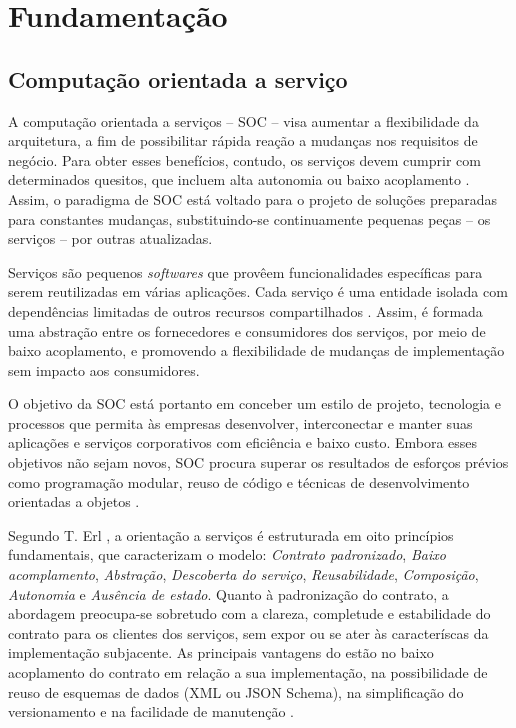 \section{Fundamentação}
\label{Fundamentacao}

\subsection{Computação orientada a serviço}

A computação orientada a serviços -- SOC -- visa aumentar a flexibilidade da
arquitetura, a fim de possibilitar rápida reação a mudanças nos requisitos de
negócio.
Para obter esses benefícios, contudo, os serviços devem cumprir com determinados quesitos, que
incluem alta autonomia ou baixo acoplamento \cite{erl2008soa}. Assim, o paradigma de SOC
está voltado para o projeto de soluções preparadas para constantes mudanças,
substituindo-se continuamente pequenas peças -- os serviços -- por outras
atualizadas.

Serviços são pequenos \textit{softwares} que provêem funcionalidades específicas
para serem reutilizadas em várias aplicações. Cada serviço é uma entidade isolada com
dependências limitadas de outros recursos compartilhados
\cite{serrano2014service}. Assim, é formada uma abstração entre os fornecedores
e consumidores dos serviços, por meio de baixo acoplamento, e promovendo a
flexibilidade de mudanças de implementação sem impacto aos consumidores.

O objetivo da SOC está portanto em conceber um estilo de projeto, tecnologia e
processos que permita às empresas desenvolver, interconectar e manter suas
aplicações e serviços corporativos com eficiência e baixo custo. Embora esses
objetivos não sejam novos, SOC procura superar os resultados de esforços
prévios como programação modular, reuso de código e técnicas de desenvolvimento orientadas a
objetos \cite{papazoglou2007serviceApprTechRechIss}.
% 

Segundo T. Erl \cite{erl2009web}, a orientação a serviços é estruturada em oito
princípios fundamentais, que caracterizam o modelo: \textit{Contrato
padronizado}, \textit{Baixo acomplamento}, \textit{Abstração},
\textit{Descoberta do serviço}, \textit{Reusabilidade}, \textit{Composição},
\textit{Autonomia} e \textit{Ausência de estado}. Quanto à padronização do
contrato, a abordagem \CtFirst{} preocupa-se sobretudo com a clareza, completude e
estabilidade do contrato para os clientes dos serviços, sem expor ou se ater às
caracteríscas da implementação subjacente. As principais vantagens do \CtFirst{} 
estão no baixo acoplamento do contrato em
relação a sua implementação, na possibilidade de reuso de esquemas de dados (XML
ou JSON Schema), na simplificação do versionamento e na facilidade de manutenção
\cite{karthikeyancontract}.

